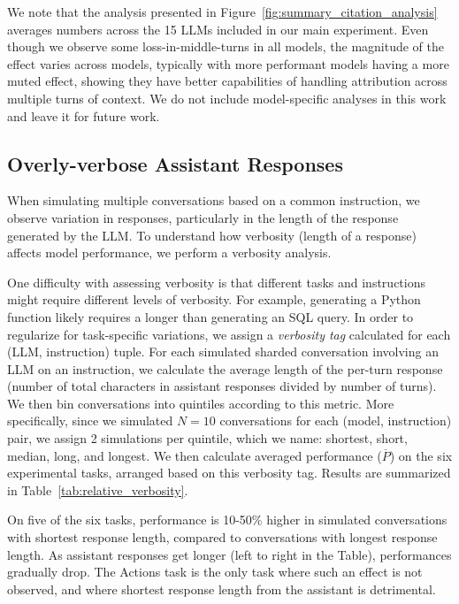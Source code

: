 \documentclass{article}
\begin{document}
\begin{appendices}
We note that the analysis presented in Figure~\ref{fig:summary_citation_analysis} averages numbers across the 15 LLMs included in our main experiment. Even though we observe some loss-in-middle-turns in all models, the magnitude of the effect varies across models, typically with more performant models having a more muted effect, showing they have better capabilities of handling attribution across multiple turns of context. We do not include model-specific analyses in this work and leave it for future work.

\subsection{Overly-verbose Assistant Responses} \label{app:assistant_verbosity}



When simulating multiple conversations based on a common instruction, we observe variation in responses, particularly in the length of the response generated by the LLM. To understand how verbosity (length of a response) affects model performance, we perform a verbosity analysis.

One difficulty with assessing verbosity is that different tasks and instructions might require different levels of verbosity. For example, generating a Python function likely requires a longer than generating an SQL query. In order to regularize for task-specific variations, we assign a \textit{verbosity tag} calculated for each (LLM, instruction) tuple. For each simulated sharded conversation involving an LLM on an instruction, we calculate the average length of the per-turn response (number of total characters in assistant responses divided by number of turns). We then bin conversations into quintiles according to this metric. More specifically, since we simulated $N=10$ conversations for each (model, instruction) pair, we assign 2 simulations per quintile, which we name: shortest, short, median, long, and longest. We then calculate averaged performance ($\overline{P}$) on the six experimental tasks, arranged based on this verbosity tag. Results are summarized in Table~\ref{tab:relative_verbosity}.

On five of the six tasks, performance is 10-50\% higher in simulated conversations with shortest response length, compared to conversations with longest response length. As assistant responses get longer (left to right in the Table), performances gradually drop. The Actions task is the only task where such an effect is not observed, and where shortest response length from the assistant is detrimental.


\end{appendices}
\end{document}
